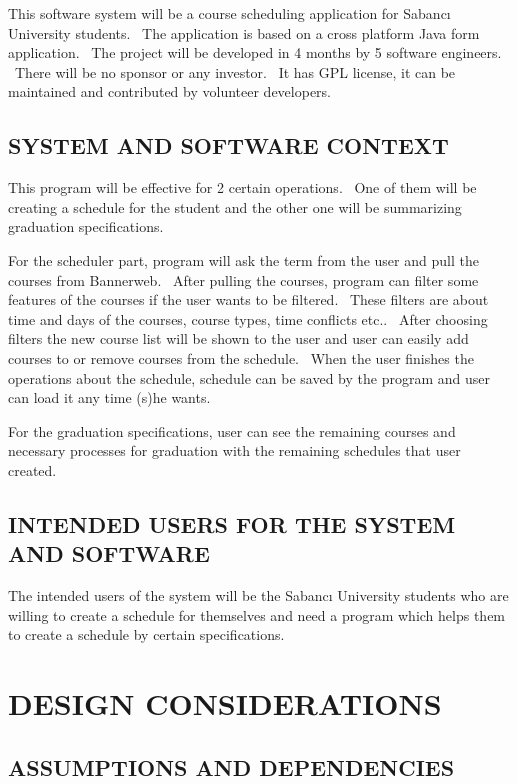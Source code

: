 \documentclass[twoside,letterpaper]{article}
\begin{document}
This software system will be a course scheduling application for Sabanc\i{} University students. \ The application is based on a cross platform Java form application. \ The project will be developed in 4 months by 5 software engineers. \ There will be no sponsor or any investor. \ It has GPL license, it can be maintained and contributed by volunteer developers.

\subsection{SYSTEM AND SOFTWARE CONTEXT}

This program will be effective for 2 certain operations. \ One of them will be creating a schedule for the student and the other one will be summarizing graduation specifications.
\bigskip

\noindent
For the scheduler part, program will ask the term from the user and pull the courses from Bannerweb. \ After pulling the courses, program can filter some features of the courses if the user wants to be filtered. \ These filters are about time and days of the courses, course types, time conflicts etc.. \ After choosing filters the new course list will be shown to the user and user can easily add courses to or remove courses from the schedule. \ When the user finishes the operations about the schedule, schedule can be saved by the program and user can load it any time (s)he wants.
\bigskip

\noindent
For the graduation specifications, user can see the remaining courses and necessary processes for graduation with the remaining schedules that user created.

\subsection{INTENDED USERS FOR THE SYSTEM AND SOFTWARE}

The intended users of the system will be the Sabanc\i{} University students who are willing to create a schedule for themselves and need a program which helps them to create a schedule by certain specifications.

\clearpage\pagestyle{Standard}
\section{DESIGN CONSIDERATIONS}
\label{sec:considerations}
\subsection{ASSUMPTIONS AND DEPENDENCIES}
\end{document}
